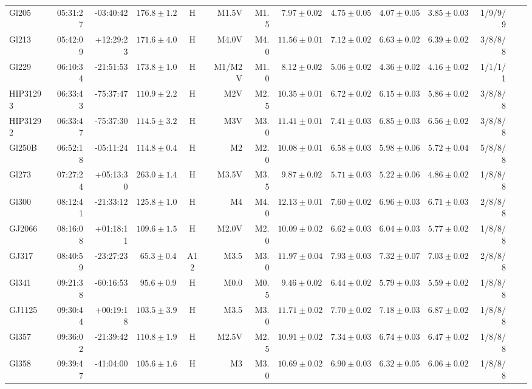 \documentclass[referee]{aa}
\begin{document}
\begin{table}[h!]
{\begin{tabular}{ l r r r c r r r r r r r r r}
Gl205 & 05:31:27 & -03:40:42 & $176.8 \pm  1.2$ & H & M1.5V & M1.5 &  $7.97 \pm 0.02$ & $4.75 \pm 0.05$ & $4.07 \pm 0.05$ & $3.85 \pm 0.03$ & 1/9/9/9 \\
Gl213 & 05:42:09 & +12:29:23 & $171.6 \pm  4.0$ & H & M4.0V & M4.0 &  $11.56 \pm 0.01$ & $7.12 \pm 0.02$ & $6.63 \pm 0.02$ & $6.39 \pm 0.02$ & 3/8/8/8 \\
Gl229 & 06:10:34 & -21:51:53 & $173.8 \pm  1.0$ & H & M1/M2V & M1.0 &  $8.12 \pm 0.02$ & $5.06 \pm 0.02$ & $4.36 \pm 0.02$ & $4.16 \pm 0.02$ & 1/1/1/1 \\
HIP31293 & 06:33:43 & -75:37:47 & $110.9 \pm  2.2$ & H & M2V & M2.5 &  $10.35 \pm 0.01$ & $6.72 \pm 0.02$ & $6.15 \pm 0.03$ & $5.86 \pm 0.02$ & 3/8/8/8 \\
HIP31292 & 06:33:47 & -75:37:30 & $114.5 \pm  3.2$ & H & M3V & M3.0 &  $11.41 \pm 0.01$ & $7.41 \pm 0.03$ & $6.85 \pm 0.03$ & $6.56 \pm 0.02$ & 3/8/8/8 \\
Gl250B & 06:52:18 & -05:11:24 & $114.8 \pm  0.4$ & H & M2 & M2.0 &  $10.08 \pm 0.01$ & $6.58 \pm 0.03$ & $5.98 \pm 0.06$ & $5.72 \pm 0.04$ & 5/8/8/8 \\
Gl273 & 07:27:24 & +05:13:30 & $263.0 \pm  1.4$ & H & M3.5V & M3.5 &  $9.87 \pm 0.02$ & $5.71 \pm 0.03$ & $5.22 \pm 0.06$ & $4.86 \pm 0.02$ & 1/8/8/8 \\
Gl300 & 08:12:41 & -21:33:12 & $125.8 \pm  1.0$ & H & M4 & M4.0 &  $12.13 \pm 0.01$ & $7.60 \pm 0.02$ & $6.96 \pm 0.03$ & $6.71 \pm 0.03$ & 2/8/8/8 \\
GJ2066 & 08:16:08 & +01:18:11 & $109.6 \pm  1.5$ & H & M2.0V & M2.0 &  $10.09 \pm 0.02$ & $6.62 \pm 0.03$ & $6.04 \pm 0.03$ & $5.77 \pm 0.02$ & 1/8/8/8 \\
GJ317 & 08:40:59 & -23:27:23 & $65.3 \pm  0.4$ & A12 & M3.5 & M3.0 &  $11.97 \pm 0.04$ & $7.93 \pm 0.03$ & $7.32 \pm 0.07$ & $7.03 \pm 0.02$ & 2/8/8/8 \\
Gl341 & 09:21:38 & -60:16:53 & $95.6 \pm  0.9$ & H & M0.0 & M0.5 &  $9.46 \pm 0.02$ & $6.44 \pm 0.02$ & $5.79 \pm 0.03$ & $5.59 \pm 0.02$ & 1/8/8/8 \\
GJ1125 & 09:30:44 & +00:19:18 & $103.5 \pm  3.9$ & H & M3.5 & M3.0 &  $11.71 \pm 0.02$ & $7.70 \pm 0.02$ & $7.18 \pm 0.03$ & $6.87 \pm 0.02$ & 1/8/8/8 \\
Gl357 & 09:36:02 & -21:39:42 & $110.8 \pm  1.9$ & H & M2.5V & M2.5 &  $10.91 \pm 0.02$ & $7.34 \pm 0.03$ & $6.74 \pm 0.03$ & $6.47 \pm 0.02$ & 1/8/8/8 \\
Gl358 & 09:39:47 & -41:04:00 & $105.6 \pm  1.6$ & H & M3 & M3.0 &  $10.69 \pm 0.02$ & $6.90 \pm 0.03$ & $6.32 \pm 0.05$ & $6.06 \pm 0.02$ & 1/8/8/8 \\

\end{tabular}}
\end{table}
\end{document}
